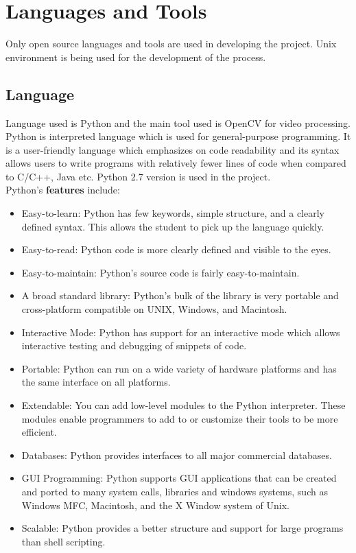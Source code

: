 \section{Languages and Tools}
Only open source languages and tools are used in developing the project. Unix environment is being used for the development of the process.
\subsection{Language}
Language used is Python and the main tool used is OpenCV for video processing. Python is interpreted language which is used for general-purpose programming. It is a user-friendly language which emphasizes on code readability and its syntax allows users to write programs with relatively fewer lines of code when compared to C/C++, Java etc. Python 2.7 version is used in the project.\\
Python's \textbf{features} include:
\begin{itemize}
\item Easy-to-learn: Python has few keywords, simple structure, and a clearly defined syntax. This allows the student to pick up the language quickly.
\item Easy-to-read: Python code is more clearly defined and visible to the eyes.
\item Easy-to-maintain: Python's source code is fairly easy-to-maintain.
\item A broad standard library: Python's bulk of the library is very portable and cross-platform compatible on UNIX, Windows, and Macintosh.
\item Interactive Mode: Python has support for an interactive mode which allows interactive testing and debugging of snippets of code.
\item Portable: Python can run on a wide variety of hardware platforms and has the same interface on all platforms.
\item Extendable: You can add low-level modules to the Python interpreter. These modules enable programmers to add to or customize their tools to be more efficient.
\item Databases: Python provides interfaces to all major commercial databases.
\item GUI Programming: Python supports GUI applications that can be created and ported to many system calls, libraries and windows systems, such as Windows MFC, Macintosh, and the X Window system of Unix.
\item Scalable: Python provides a better structure and support for large programs than shell scripting.
\end{itemize}
